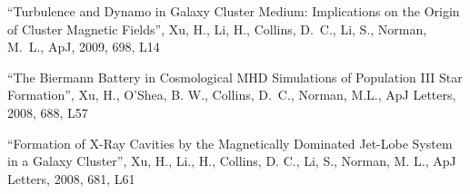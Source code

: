 \medskip
\noindent
``Turbulence and Dynamo in Galaxy Cluster Medium: Implications on the Origin of Cluster Magnetic Fields'',
Xu, H., Li, H., Collins, D.~C., Li, S., Norman, M.~L.,
ApJ, 2009, 698, L14

\medskip
\noindent
``The Biermann Battery in Cosmological MHD Simulations of Population III Star Formation'',
Xu, H., O'Shea, B. W., Collins, D.~C., Norman, M.L.,
ApJ Letters, 2008, 688, L57  

\medskip
\noindent
``Formation of X-Ray Cavities by the Magnetically Dominated Jet-Lobe System in a Galaxy Cluster'',
Xu, H., Li., H., Collins, D. C., Li, S., Norman, M. L.,
ApJ Letters, 2008, 681, L61 
